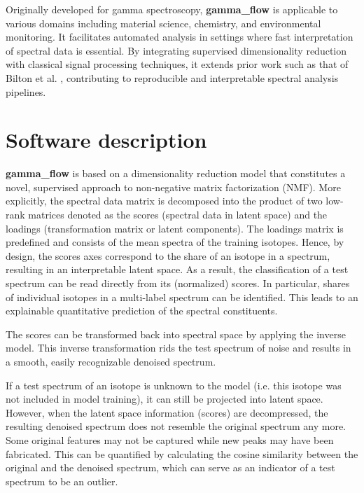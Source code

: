 \documentclass[preprint,12pt, a4paper]{elsarticle}
\begin{document}
Originally developed for gamma spectroscopy, \textbf{gamma\_flow} is applicable to various domains including material science, chemistry, and environmental monitoring. It facilitates automated analysis in settings where fast interpretation of spectral data is essential. By integrating supervised dimensionality reduction with classical signal processing techniques, it extends prior work such as that of Bilton et al. \cite{Bilton2019}, contributing to reproducible and interpretable spectral analysis pipelines.



\section{Software description}

\textbf{gamma\_flow} is based on a dimensionality reduction model that constitutes a novel, supervised approach to non-negative matrix factorization (NMF). More explicitly, the spectral data matrix is decomposed into the product of two low-rank matrices denoted as the scores (spectral data in latent space) and the loadings (transformation matrix or latent components). The loadings matrix is predefined and consists of the mean spectra of the training isotopes. Hence, by design, the scores axes correspond to the share of an isotope in a spectrum, resulting in an interpretable latent space. As a result, the classification of a test spectrum can be read directly from its (normalized) scores. In particular, shares of individual isotopes in a multi-label spectrum can be identified. This leads to an explainable quantitative prediction of the spectral constituents. 

The scores can be transformed back into spectral space by applying the inverse model. This inverse transformation rids the test spectrum of noise and results in a smooth, easily recognizable denoised spectrum. 

If a test spectrum of an isotope is unknown to the model (i.e. this isotope was not included in model training), it can still be projected into latent space. However, when the latent space information (scores) are decompressed, the resulting denoised spectrum does not resemble the original spectrum any more. Some original features may not be captured while new peaks may have been fabricated. This can be quantified by calculating the cosine similarity between the original and the denoised spectrum, which can serve as an indicator of a test spectrum 
to be an outlier.
\end{document}
